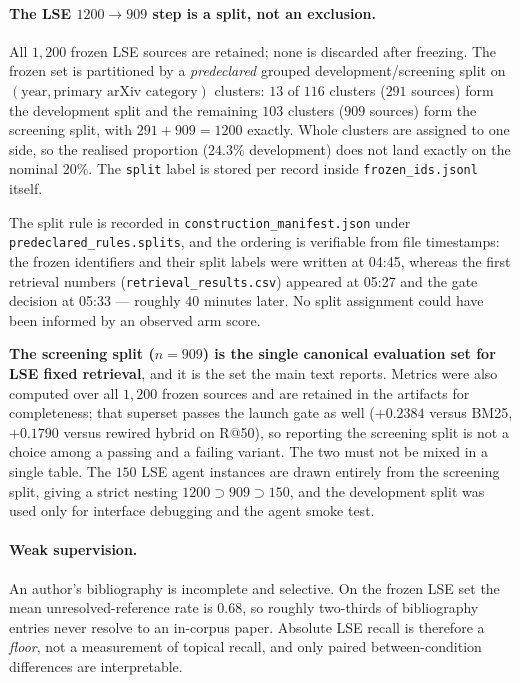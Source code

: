 \paragraph{The LSE $1200 \rightarrow 909$ step is a split, not an exclusion.}
All $1{,}200$ frozen LSE sources are retained; none is discarded after freezing. The frozen set is
partitioned by a \emph{predeclared} grouped development/screening split on
$(\text{year}, \text{primary arXiv category})$ clusters: $13$ of $116$ clusters
($291$ sources) form the development split and the remaining $103$ clusters ($909$ sources) form
the screening split, with $291 + 909 = 1200$ exactly. Whole clusters are assigned to one side, so
the realised proportion ($24.3\%$ development) does not land exactly on the nominal $20\%$. The
\texttt{split} label is stored per record inside \texttt{frozen\_ids.jsonl} itself.

The split rule is recorded in \texttt{construction\_manifest.json} under
\texttt{predeclared\_rules.splits}, and the ordering is verifiable from file timestamps: the frozen
identifiers and their split labels were written at 04:45, whereas the first retrieval numbers
(\texttt{retrieval\_results.csv}) appeared at 05:27 and the gate decision at 05:33 --- roughly $40$
minutes later. No split assignment could have been informed by an observed arm score.

\textbf{The screening split ($n{=}909$) is the single canonical evaluation set for LSE fixed
retrieval}, and it is the set the main text reports. Metrics were also computed over all $1{,}200$
frozen sources and are retained in the artifacts for completeness; that superset passes the launch
gate as well ($+0.2384$ versus BM25, $+0.1790$ versus rewired hybrid on R@50), so reporting the
screening split is not a choice among a passing and a failing variant. The two must not be mixed in
a single table. The $150$ LSE agent instances are drawn entirely from the screening split, giving a
strict nesting $1200 \supset 909 \supset 150$, and the development split was used only for
interface debugging and the agent smoke test.

\paragraph{Weak supervision.} An author's bibliography is incomplete and selective. On the frozen
LSE set the mean unresolved-reference rate is $0.68$, so roughly two-thirds of bibliography entries
never resolve to an in-corpus paper. Absolute LSE recall is therefore a \emph{floor}, not a
measurement of topical recall, and only paired between-condition differences are interpretable.


